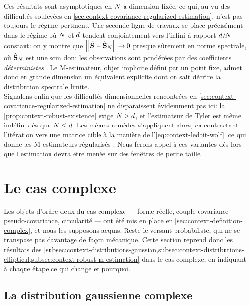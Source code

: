 Ces résultats sont asymptotiques en $N$ à dimension fixée, ce qui, au vu des difficultés soulevées en \cref{sec:context-covariance-regularized-estimation}, n'est pas toujours le régime pertinent. Une seconde ligne de travaux se place précisément dans le régime où $N$ et $d$ tendent conjointement vers l'infini à rapport $d/N$ constant: on y montre que $\left\lVert\tilde{\boldsymbol{S}} - \hat{\mathbf{S}}_N\right\rVert\to 0$ presque sûrement en norme spectrale, où $\hat{\mathbf{S}}_N$ est une scm dont les observations sont pondérées par des coefficients \emph{déterministes} . Le M-estimateur, objet implicite défini par un point fixe, admet donc en grande dimension un équivalent explicite dont on sait décrire la distribution spectrale limite. \\

Signalons enfin que les difficultés dimensionnelles rencontrées en \cref{sec:context-covariance-regularized-estimation} ne disparaissent évidemment pas ici: la \cref{prop:context-robust-existence} exige $N>d$, et l'estimateur de Tyler est même indéfini dès que $N\leq d$. Les mêmes remèdes s'appliquent alors, en contractant l'itération vers une matrice cible à la manière de l'\cref{eq:context-ledoit-wolf}, ce qui donne les M-estimateurs régularisés . Nous ferons appel à ces variantes dès lors que l'estimation devra être menée sur des fenêtres de petite taille.

\section{Le cas complexe}
\label{sec:context-distributions-complex}

Les objets d'ordre deux du cas complexe --- forme réelle, couple covariance--pseudo-covariance, circularité --- ont été mis en place en \cref{sec:context-definition-complex}, et nous les supposons acquis. Reste le versant probabiliste, qui ne se transpose pas davantage de façon mécanique. Cette section reprend donc les résultats des \cref{subsec:context-distributions-gaussian,subsec:context-distributions-elliptical,subsec:context-robust-m-estimation} dans le cas complexe, en indiquant à chaque étape ce qui change et pourquoi.

\subsection{La distribution gaussienne complexe}


